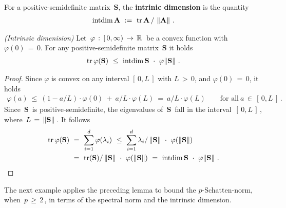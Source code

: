 \begin{definition*}
  \label{rmineq_intrinsic_bernstein}
  For a positive-semidefinite matrix $\,\mathbf{S}$,
  the \textbf{intrinic dimension} is the quantity
  \begin{gather*}
    \mathrm{intdim}
    \,
    \mathbf{A}
    \ 
    :=
    \ 
\mathrm{tr}\,\mathbf{A}
\,
/
\,
\norm{\mathbf{A}}
    \,
    .
  \end{gather*}
\end{definition*}
\begin{lemma*}
  \emph{(Intrinsic dimenision)}
  Let 
  $
  \,
    \varphi\,:\, [\,0,\infty) \,\to\, \mathbb{R}
    \,
  $
  be a convex function with
  $
    \varphi(0)\,=\,0
  $.
  For any positive-semidefinite matrix $\,\mathbf{S}$ it holds 
  \begin{gather*}
    \mathrm{tr}\,\varphi(\mathbf{S})
    \ 
    \le
    \ 
    \mathrm{intdim}\,\mathbf{S}
    \ 
    \cdot
    \ 
    \varphi\!\norm{\mathbf{S}}
    \,
    .
  \end{gather*}
\end{lemma*}
\begin{proof}
  \emph{\cite[Lemma~7.5.1]{Tropp2015}}
  Since $\varphi$ is convex on any interval $[\,0,L\,]$ with $L\,>\,0$, and $\varphi(0)\,=\,0$, it holds
  \begin{gather*}
    \varphi(a)
    \ 
    \le
    \ 
    \left( 
      1 - a/L
    \right)
    \cdot
    \varphi(0)
    \ 
    +
    \ 
    a/L
    \cdot
    \varphi(L)
    \ 
    =
    \ 
    a/L
    \cdot
    \varphi(L)
    \qquad
    \text{for all}\ 
    a \,\in\, [\,0,L\,]
    \,
    .
  \end{gather*}
  Since $\,\mathbf{S}\,$ is positive-semidefinite, the eigenvalues of $\,\mathbf{S}\,$ 
  fall in the interval $\,[\,0,L\,]\,$, where $\,L\,=\,\left\lVert\mathbf{S}\right\rVert\,$.
  It follows 
  \begin{align*}
    \mathrm{tr}\,\varphi(\mathbf{S})
    &
    \ 
    =
    \ 
    \sum_{i=1}^{d}
    \varphi(\lambda_i)
    \ 
    \le
    \ 
    \sum_{i=1}^{d}
    \lambda_i
    /
    \norm{\mathbf{S}}
    \ 
    \cdot
    \ 
    \varphi(\norm{\mathbf{S}})
    \\
    &
    \ 
    =
    \ 
    \mathrm{tr}(\mathbf{S})
    /
    \norm{\mathbf{S}}
    \ 
    \cdot
    \ 
    \varphi(\norm{\mathbf{S}})
    \ 
    =
    \ 
    \mathrm{intdim}\,\mathbf{S}
    \ 
    \cdot
    \ 
    \varphi\!\norm{\mathbf{S}}
    \,
    .
  \end{align*}
\end{proof}
The next example applies the preceding lemma to bound the $p$-Schatten-norm, when $\,p\,\ge\, 2\,$, in terms of the spectral norm and the intrinsic dimension.

